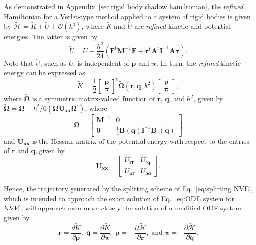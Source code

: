 \documentclass[
journal=jctcce,
layout=twocolumn
]{achemso}
\newcommand{\mt}[1]{\boldsymbol{\mathbf{#1}}}   %
\newcommand{\vt}[1]{\boldsymbol{\mathbf{#1}}}   %
\newcommand{\tr}[1]{#1^\text{t}}                %
\newcommand{\diff}[2]{\frac{\partial #1}{\partial #2}} %
\newcommand{\Ham}[1]{{\mathcal H}_\text{#1}}    %
\newcommand{\timestep}{h}
\newcommand{\modified}[1]{\widetilde{#1}}
\begin{document}
As demonstrated in Appendix~\ref{sec:rigid body shadow hamiltonian}, the \textit{refined} Hamiltonian for a Verlet-type method applied to a system of rigid bodies is given by $\modified{\Ham{}} = \modified K + \modified U + \mathcal{O}(h^4)$, where $\modified K$ and $\modified U$ are \textit{refined} kinetic and potential energies.
The latter is given by
\begin{equation}
\label{eq:modified potential energy}
\modified U = U - \frac{\timestep^2}{24} \left( \tr{\vt F} {\mt M}^{-1} {\vt F} + \tr{\vt \tau} \tr{\mt A} {\mt I}^{-1} {\mt A} {\vt \tau} \right).
\end{equation}
Note that $\modified U$, such as $U$, is independent of $\vt p$ and $\vt \pi$.
In turn, the \textit{refined} kinetic energy can be expressed as
\begin{equation}
\label{eq:modified kinetic energy}
\modified K = \frac{1}{2} \tr{ \left[\begin{array}{c} \vt p \\ \vt \pi \end{array}\right]} \modified{\mathbf \Omega}(\vt r, \vt q, \timestep^2) \left[\begin{array}{c} \vt p \\ \vt \pi \end{array}\right],
\end{equation}
where $\modified{\mathbf \Omega}$ is a symmetric matrix-valued function of $\vt r$, $\vt q$, and $\timestep^2$, given by $\tilde{\mt \Omega} = {\mt \Omega} + {\timestep^2}/{6} \left( {\mt \Omega} {\mt U}_{\vt x \vt x} \tr{\mt \Omega} \right)$, where
\begin{equation*}
{\mt \Omega} = \left[\begin{array}{cc}
{\mt M}^{-1} & \mt 0 \\
\mt 0 & \frac{1}{4} {\mt B}(\vt q) {\mt I}^{-1} \tr{\mt B}(\vt q)
\end{array}\right]
\end{equation*}
and ${\mt U}_{\vt x \vt x}$ is the Hessian matrix of the potential energy with respect to the entries of $\vt r$ and $\vt q$, given by
\begin{equation*}
{\mt U}_{\vt x \vt x} = \left[\begin{array}{cc}
U_{\vt r \vt r} & U_{\vt r \vt q} \\
U_{\vt q \vt r} & U_{\vt q \vt q}
\end{array}\right].
\end{equation*}

Hence, the trajectory generated by the splitting scheme of Eq.~\ref{eq:splitting NVE}, which is intended to approach the exact solution of Eq.~\eqref{eq:ODE system for NVE}, will approach even more closely the solution of a modified ODE system given by
\begin{equation*}
\dot{\vt r} = \diff{\modified K}{\vt p}, \;
\dot{\vt q} = \diff{\modified K}{\vt \pi}, \;
\dot{\vt p} = -\diff{\modified{\Ham{}}}{\vt r}, \; \text{and} \;
\dot{\vt \pi} = -\diff{\modified{\Ham{}}}{\vt q}.
\end{equation*}
\end{document}
